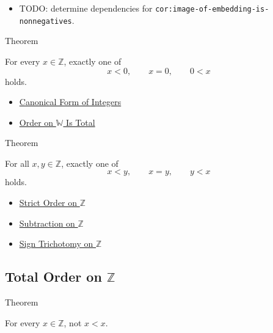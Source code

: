 \begin{dependencies}
\begin{itemize}
  \item TODO: determine dependencies for \texttt{cor:image-of-embedding-is-nonnegatives}.
\end{itemize}
\end{dependencies}

\begin{theorembox}{Theorem}
\begin{theorem}
\label{thm:sign-trichotomy-on-z}
For every $x\in\mathbb{Z}$, exactly one of
\[
x<0,\qquad x=0,\qquad 0<x
\]
holds.
\end{theorem}
\end{theorembox}

\begin{dependencies}
\begin{itemize}
  \item \hyperref[thm:canonical-form-of-integers]{Canonical Form of Integers}
  \item \hyperref[thm:order-on-w-total]{Order on $\mathbb{W}$ Is Total}
\end{itemize}
\end{dependencies}

\begin{theorembox}{Theorem}
\begin{theorem}
\label{thm:trichotomy-on-z}
For all $x,y\in\mathbb{Z}$, exactly one of
\[
x<y,\qquad x=y,\qquad y<x
\]
holds.
\end{theorem}
\end{theorembox}

\begin{dependencies}
\begin{itemize}
  \item \hyperref[def:strict-order-on-z]{Strict Order on $\mathbb{Z}$}
  \item \hyperref[def:subtraction-on-z]{Subtraction on $\mathbb{Z}$}
  \item \hyperref[thm:sign-trichotomy-on-z]{Sign Trichotomy on $\mathbb{Z}$}
\end{itemize}
\end{dependencies}

\subsection*{Total Order on $\mathbb{Z}$}

\begin{theorembox}{Theorem}
\begin{theorem}
\label{thm:strict-order-on-z-irreflexive}
For every $x\in\mathbb{Z}$, not $x<x$.
\end{theorem}
\end{theorembox}

